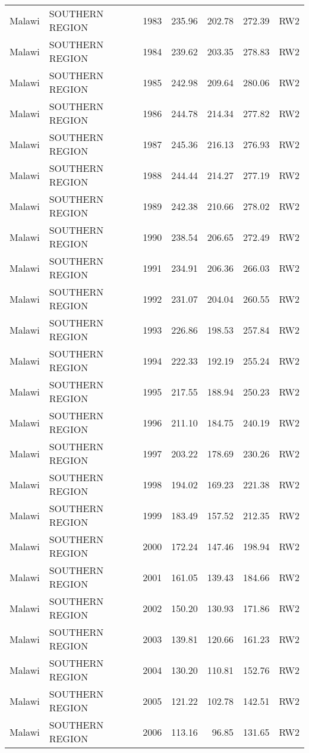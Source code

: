 \begin{longtable}{lllrrrl}
  Malawi & SOUTHERN REGION & 1983 & 235.96 & 202.78 & 272.39 & RW2 \\ 
  Malawi & SOUTHERN REGION & 1984 & 239.62 & 203.35 & 278.83 & RW2 \\ 
  Malawi & SOUTHERN REGION & 1985 & 242.98 & 209.64 & 280.06 & RW2 \\ 
  Malawi & SOUTHERN REGION & 1986 & 244.78 & 214.34 & 277.82 & RW2 \\ 
  Malawi & SOUTHERN REGION & 1987 & 245.36 & 216.13 & 276.93 & RW2 \\ 
  Malawi & SOUTHERN REGION & 1988 & 244.44 & 214.27 & 277.19 & RW2 \\ 
  Malawi & SOUTHERN REGION & 1989 & 242.38 & 210.66 & 278.02 & RW2 \\ 
  Malawi & SOUTHERN REGION & 1990 & 238.54 & 206.65 & 272.49 & RW2 \\ 
  Malawi & SOUTHERN REGION & 1991 & 234.91 & 206.36 & 266.03 & RW2 \\ 
  Malawi & SOUTHERN REGION & 1992 & 231.07 & 204.04 & 260.55 & RW2 \\ 
  Malawi & SOUTHERN REGION & 1993 & 226.86 & 198.53 & 257.84 & RW2 \\ 
  Malawi & SOUTHERN REGION & 1994 & 222.33 & 192.19 & 255.24 & RW2 \\ 
  Malawi & SOUTHERN REGION & 1995 & 217.55 & 188.94 & 250.23 & RW2 \\ 
  Malawi & SOUTHERN REGION & 1996 & 211.10 & 184.75 & 240.19 & RW2 \\ 
  Malawi & SOUTHERN REGION & 1997 & 203.22 & 178.69 & 230.26 & RW2 \\ 
  Malawi & SOUTHERN REGION & 1998 & 194.02 & 169.23 & 221.38 & RW2 \\ 
  Malawi & SOUTHERN REGION & 1999 & 183.49 & 157.52 & 212.35 & RW2 \\ 
  Malawi & SOUTHERN REGION & 2000 & 172.24 & 147.46 & 198.94 & RW2 \\ 
  Malawi & SOUTHERN REGION & 2001 & 161.05 & 139.43 & 184.66 & RW2 \\ 
  Malawi & SOUTHERN REGION & 2002 & 150.20 & 130.93 & 171.86 & RW2 \\ 
  Malawi & SOUTHERN REGION & 2003 & 139.81 & 120.66 & 161.23 & RW2 \\ 
  Malawi & SOUTHERN REGION & 2004 & 130.20 & 110.81 & 152.76 & RW2 \\ 
  Malawi & SOUTHERN REGION & 2005 & 121.22 & 102.78 & 142.51 & RW2 \\ 
  Malawi & SOUTHERN REGION & 2006 & 113.16 & 96.85 & 131.65 & RW2 \\ 

\end{longtable}
